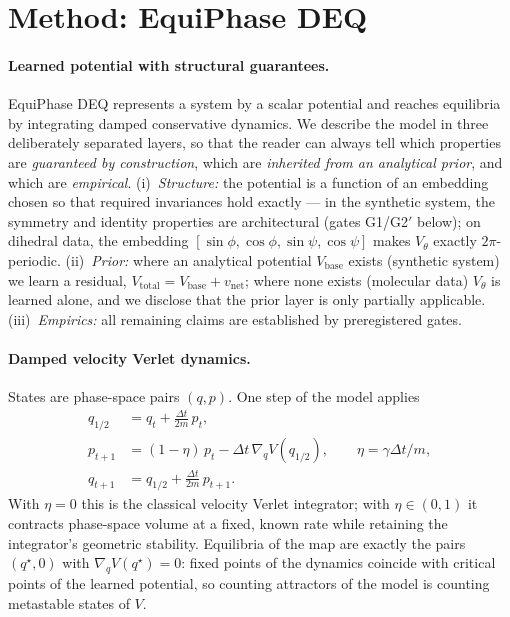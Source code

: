 \section{Method: EquiPhase DEQ}
\label{sec:method}

\paragraph{Learned potential with structural guarantees.}
EquiPhase DEQ represents a system by a scalar potential and reaches
equilibria by integrating damped conservative dynamics. We describe the
model in three deliberately separated layers, so that the reader can always
tell which properties are \emph{guaranteed by construction}, which are
\emph{inherited from an analytical prior}, and which are \emph{empirical}.
(i)~\textit{Structure:} the potential is a function of an embedding chosen
so that required invariances hold exactly — in the synthetic system, the
symmetry and identity properties are architectural (gates G1/G2$'$ below);
on dihedral data, the embedding
$[\sin\phi,\cos\phi,\sin\psi,\cos\psi]$ makes $V_\theta$ exactly
$2\pi$-periodic. (ii)~\textit{Prior:} where an analytical potential
$V_{\mathrm{base}}$ exists (synthetic system) we learn a residual,
$V_{\mathrm{total}}=V_{\mathrm{base}}+v_{\mathrm{net}}$; where none exists
(molecular data) $V_\theta$ is learned alone, and we disclose that the
prior layer is only partially applicable. (iii)~\textit{Empirics:} all
remaining claims are established by preregistered gates.

\paragraph{Damped velocity Verlet dynamics.}
States are phase-space pairs $(q,p)$. One step of the model applies
\begin{align}
q_{1/2} &= q_t + \tfrac{\Delta t}{2m}\,p_t, \\
p_{t+1} &= (1-\eta)\,p_t - \Delta t\,\nabla_q V(q_{1/2}),
\qquad \eta = \gamma \Delta t / m, \\
q_{t+1} &= q_{1/2} + \tfrac{\Delta t}{2m}\,p_{t+1}.
\end{align}
With $\eta=0$ this is the classical velocity Verlet integrator; with
$\eta\in(0,1)$ it contracts phase-space volume at a fixed, known rate while
retaining the integrator's geometric stability. Equilibria of the map are
exactly the pairs $(q^\star, 0)$ with $\nabla_q V(q^\star)=0$: fixed points
of the dynamics coincide with critical points of the learned potential, so
counting attractors of the model is counting metastable states of $V$.

